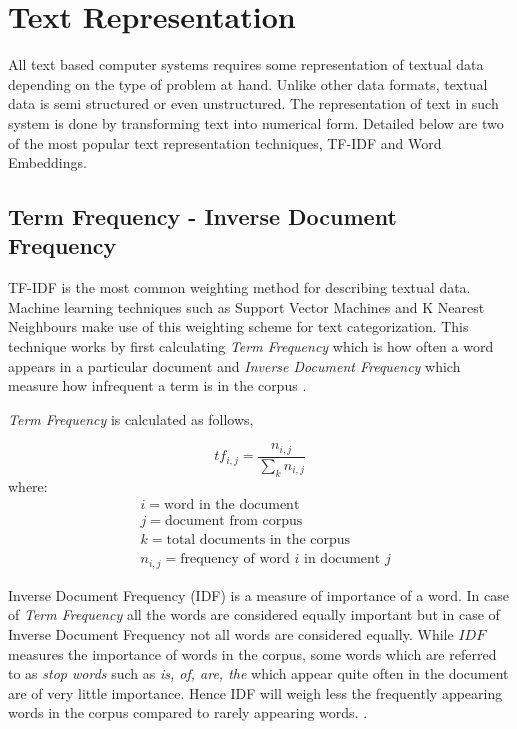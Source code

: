 \section{Text Representation}\label{backgroundTextRepresentation}

All text based computer systems requires some representation of textual data depending on the type of problem at hand. Unlike other data formats, textual data is semi structured or even unstructured. The representation of text in such system is done by transforming text into numerical form.  Detailed below are two of the most popular text representation techniques, \gls{TF-IDF} and Word Embeddings.  

\subsection{Term Frequency - Inverse Document Frequency}
\gls{TF-IDF} is the most common weighting method for describing textual data. Machine learning techniques such as Support Vector Machines and K Nearest Neighbours make use of this weighting scheme for text categorization. This technique works by first calculating \textit{Term Frequency} which is how often a word appears in a particular document and \textit{Inverse Document Frequency} which measure how infrequent a term is in the corpus \cite{soucy2005beyond}.

\textit{Term Frequency} is calculated as follows,

\begin{equation}\label{tf}
tf_{i,j} = \frac{n_{i,j}}{\sum_{k}n_{i,j}}
\end{equation}
where:
\begin{align*}
      & i=\text{word in the document}\\
      & j=\text{document from corpus}\\
      & k=\text{total documents in the corpus}      \\
      & n_{i,j}=\text{frequency of word $i$ in document $j$}      
\end{align*}                

Inverse Document Frequency (IDF) is a measure of importance of a word. In case of \textit{Term Frequency} all the words are considered equally important but in case of Inverse Document Frequency not all words are considered equally. While $IDF$ measures the importance of words in the corpus, some words which are referred to as \textit{stop words} such as \textit{is, of, are, the} which appear quite often in the document are of very little importance. Hence IDF will weigh less the frequently appearing words in the corpus compared to rarely appearing words. \cite{robertson2004understanding}. 


